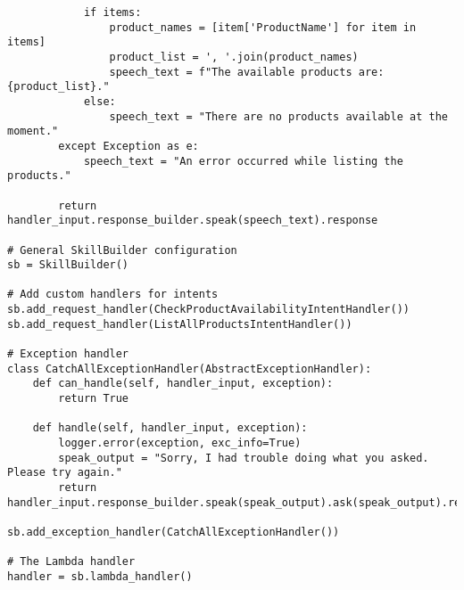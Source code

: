 \documentclass[12pt]{article}
\begin{document}
\begin{lstlisting}
            if items:
                product_names = [item['ProductName'] for item in items]
                product_list = ', '.join(product_names)
                speech_text = f"The available products are: {product_list}."
            else:
                speech_text = "There are no products available at the moment."
        except Exception as e:
            speech_text = "An error occurred while listing the products."
    
        return handler_input.response_builder.speak(speech_text).response

# General SkillBuilder configuration
sb = SkillBuilder()

# Add custom handlers for intents
sb.add_request_handler(CheckProductAvailabilityIntentHandler())
sb.add_request_handler(ListAllProductsIntentHandler())

# Exception handler
class CatchAllExceptionHandler(AbstractExceptionHandler):
    def can_handle(self, handler_input, exception):
        return True

    def handle(self, handler_input, exception):
        logger.error(exception, exc_info=True)
        speak_output = "Sorry, I had trouble doing what you asked. Please try again."
        return handler_input.response_builder.speak(speak_output).ask(speak_output).response

sb.add_exception_handler(CatchAllExceptionHandler())

# The Lambda handler
handler = sb.lambda_handler()
\end{lstlisting}
\end{document}
